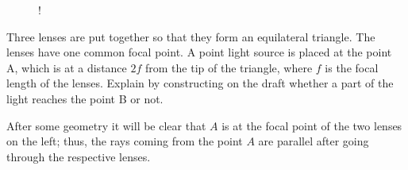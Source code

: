 {\ifEngStatement
\begin{wrapfigure}[9]{r}{0.6\textwidth}
	\vspace{-20pt}
	\begin{resizebox}{0.6\textwidth}{!}{
}
	\end{resizebox}
\end{wrapfigure}
Three lenses are put together so that they form an equilateral triangle. The lenses have one common focal point. A point light source is placed at the point A, which is at a distance $2f$ from the tip of the triangle, where $f$ is the focal length of the lenses. Explain by constructing on the draft whether a part of the light reaches the point B or not.
\fi


\ifEngHint
After some geometry it will be clear that $A$ is at the focal point of the two lenses on the left; thus, the rays coming from the point $A$ are parallel after going through the respective lenses.
\fi


}
